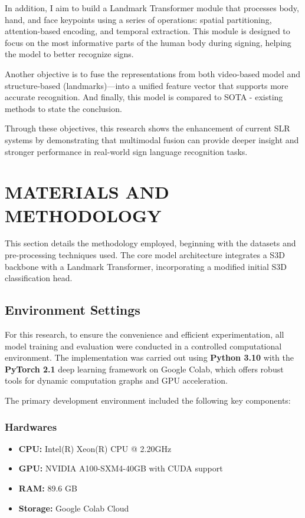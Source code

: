 \documentclass{article}
\begin{document}
In addition, I aim to build a Landmark Transformer module that processes body, hand, and face keypoints using a series of operations: spatial partitioning, attention-based encoding, and temporal extraction. This module is designed to focus on the most informative parts of the human body during signing, helping the model to better recognize signs.

\vspace{0.5cm}

Another objective is to fuse the representations from both video-based model and structure-based (landmarks)—into a unified feature vector that supports more accurate recognition. And finally, this model is compared to SOTA - existing methods to state the conclusion.

\vspace{0.5cm}

Through these objectives, this research shows the enhancement of current SLR systems by demonstrating that multimodal fusion can provide deeper insight and stronger performance in real-world sign language recognition tasks.

\section{MATERIALS AND METHODOLOGY}
This section details the methodology employed, beginning with the datasets and pre-processing techniques used. The core model architecture integrates a S3D \cite{xie2017rethinking} backbone with a Landmark Transformer, incorporating a modified initial S3D classification head.

\subsection{Environment Settings}
For this research, to ensure the convenience and efficient experimentation, all model training and evaluation were conducted in a controlled computational environment. The implementation was carried out using \textbf{Python 3.10} with the \textbf{PyTorch 2.1} deep learning framework on Google Colab, which offers robust tools for dynamic computation graphs and GPU acceleration.

\vspace{0.5cm}

\noindent The primary development environment included the following key components:

\subsubsection*{Hardwares}
\begin{itemize}
  \item \textbf{CPU:} Intel(R) Xeon(R) CPU @ 2.20GHz
  \item \textbf{GPU:} NVIDIA A100-SXM4-40GB with CUDA support
  \item \textbf{RAM:} 89.6 GB
  \item \textbf{Storage:} Google Colab Cloud
\end{itemize}
\end{document}

